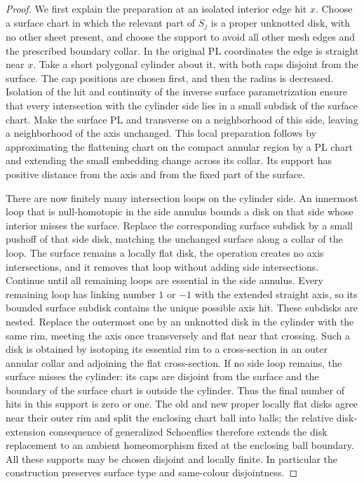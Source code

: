 \documentclass[11pt]{article}
\numberwithin{equation}{section}
\theoremstyle{definition}
\theoremstyle{remark}
\begin{document}
\begin{proof}
We first explain the preparation at an isolated interior edge hit $x$.
Choose a surface chart in which the relevant part of $S_j$ is a proper
unknotted disk, with no other sheet present, and choose the support to
avoid all other mesh edges and the prescribed boundary collar.  In the
original PL coordinates the edge is straight near $x$.  Take a short
polygonal cylinder about it, with both caps disjoint from the surface.
The cap positions are chosen first, and then the radius is decreased.
Isolation of the hit and continuity of the inverse surface
parametrization ensure that every intersection with the cylinder side
lies in a small subdisk of the surface chart.  Make the surface PL and
transverse on a neighborhood of this side, leaving a neighborhood of the
axis unchanged.  This local preparation follows by approximating the
flattening chart on the compact annular region by a PL chart and
extending the small embedding change across its collar.  Its support
has positive distance from the axis and from the fixed part of the
surface.

There are now finitely many intersection loops on the cylinder side.
An innermost loop that is null-homotopic in the side annulus bounds a
disk on that side whose interior misses the surface.  Replace the
corresponding surface subdisk by a small pushoff of that side disk,
matching the unchanged surface along a collar of the loop.  The surface
remains a locally flat disk, the operation creates no axis intersections,
and it removes that loop without adding side intersections.  Continue
until all remaining loops are essential in the side annulus.  Every
remaining loop has linking number $1$ or $-1$ with the extended straight
axis, so its bounded surface subdisk contains the unique possible axis
hit.  These subdisks are nested.  Replace the outermost one by an
unknotted disk in the cylinder with the same rim, meeting the axis once
transversely and flat near that crossing.  Such a disk is obtained by
isotoping its essential rim to a cross-section in an outer annular
collar and adjoining the flat cross-section.  If no side loop remains,
the surface misses the cylinder: its caps are disjoint from the surface
and the boundary of the surface chart is outside the cylinder.
Thus the final number of hits in this support is zero or one.  The old
and new proper locally flat disks agree near their outer rim and split
the enclosing chart ball into balls; the relative disk-extension consequence of generalized
Schoenflies \cite[Theorem~5, p.~76]{Brown1960} therefore extends the disk replacement to an
ambient homeomorphism fixed at the enclosing ball boundary.  All these
supports may be chosen disjoint and locally finite.  In particular the
construction preserves surface type and same-colour disjointness.


\end{proof}
\end{document}
